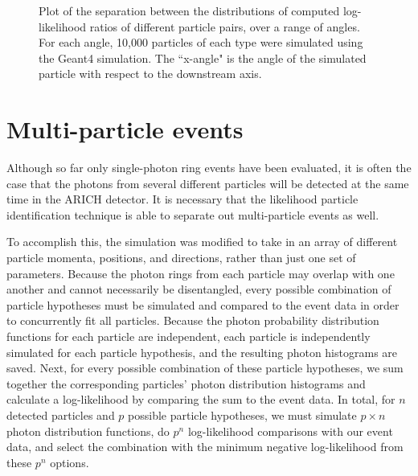 \begin{figure}[]
\centering
{}
\caption[Plot of the separation between the distributions of computed log-likelihood ratios of different particle pairs, over a range of angles. ]{Plot of the separation between the distributions of computed log-likelihood ratios of different particle pairs, over a range of angles. For each angle, 10,000 particles of each type were simulated using the Geant4 simulation. The ``x-angle" is the angle of the simulated particle with respect to the downstream axis.}\label{fig:angleSeps}
\end{figure}


\section{Multi-particle events}
\label{sec:multiparticle}
Although so far only single-photon ring events have been evaluated, it is often the case that the photons from several different particles will be detected at the same time in the ARICH detector. 
It is necessary that the likelihood particle identification technique is able to separate out multi-particle events as well. 

To accomplish this, the simulation was modified to take in an array of different particle momenta, positions, and directions, rather than just one set of parameters.
Because the photon rings from each particle may overlap with one another and cannot necessarily be disentangled, every possible combination of particle hypotheses must be simulated and compared to the event data in order to concurrently fit all particles.
Because the photon probability distribution functions for each particle are independent, each particle is independently simulated for each particle hypothesis, and the resulting photon histograms are saved.
Next, for every possible combination of these particle hypotheses, we sum together the corresponding particles' photon distribution histograms and calculate a log-likelihood by comparing the sum to the event data.
In total, for $n$ detected particles and $p$ possible particle hypotheses, we must simulate $p \times n$ photon distribution functions, do $p^n$  log-likelihood comparisons with our event data, and select the combination with the minimum negative log-likelihood from these $p^n$ options. 

